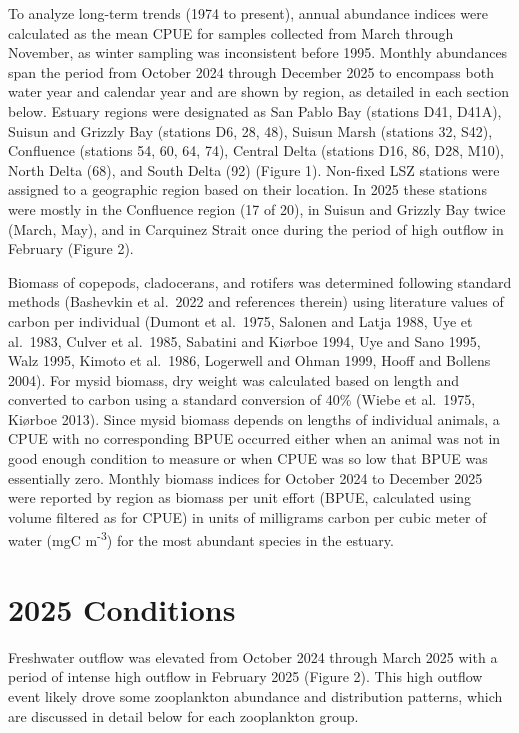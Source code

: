 \documentclass[
  letterpaper,
]{article}
\begin{document}
To analyze long-term trends (1974 to present), annual abundance indices
were calculated as the mean CPUE for samples collected from March
through November, as winter sampling was inconsistent before 1995.
Monthly abundances span the period from October 2024 through December
2025 to encompass both water year and calendar year and are shown by
region, as detailed in each section below. Estuary regions were
designated as San Pablo Bay (stations D41, D41A), Suisun and Grizzly Bay
(stations D6, 28, 48), Suisun Marsh (stations 32, S42), Confluence
(stations 54, 60, 64, 74), Central Delta (stations D16, 86, D28, M10),
North Delta (68), and South Delta (92) (Figure 1). Non-fixed LSZ
stations were assigned to a geographic region based on their location.
In 2025 these stations were mostly in the Confluence region (17 of 20),
in Suisun and Grizzly Bay twice (March, May), and in Carquinez Strait
once during the period of high outflow in February (Figure 2).

Biomass of copepods, cladocerans, and rotifers was determined following
standard methods (Bashevkin et al.~2022 and references therein) using
literature values of carbon per individual (Dumont et al.~1975, Salonen
and Latja 1988, Uye et al.~1983, Culver et al.~1985, Sabatini and
Kiørboe 1994, Uye and Sano 1995, Walz 1995, Kimoto et al.~1986,
Logerwell and Ohman 1999, Hooff and Bollens 2004). For mysid biomass,
dry weight was calculated based on length and converted to carbon using
a standard conversion of 40\% (Wiebe et al.~1975, Kiørboe 2013). Since
mysid biomass depends on lengths of individual animals, a CPUE with no
corresponding BPUE occurred either when an animal was not in good enough
condition to measure or when CPUE was so low that BPUE was essentially
zero. Monthly biomass indices for October 2024 to December 2025 were
reported by region as biomass per unit effort (BPUE, calculated using
volume filtered as for CPUE) in units of milligrams carbon per cubic
meter of water (mgC m\textsuperscript{-3}) for the most abundant species
in the estuary.

\section{2025 Conditions}\label{conditions}

Freshwater outflow was elevated from October 2024 through March 2025
with a period of intense high outflow in February 2025 (Figure 2). This
high outflow event likely drove some zooplankton abundance and
distribution patterns, which are discussed in detail below for each
zooplankton group.
\end{document}
